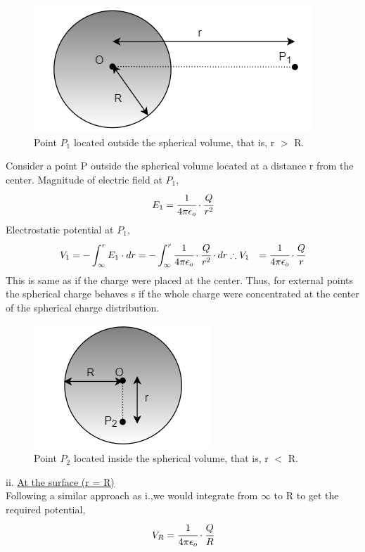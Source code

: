 \begin{figure}
     \centering 
     \includegraphics[scale = 0.6]{figures/elecmag/fig5.png}
     \caption{Point $P_1$ located outside the spherical volume, that is, r $>$ R. }
     \label{fig5}
 \end{figure}
Consider a point P outside the spherical volume located at a distance r from the center.
Magnitude of electric field at $P_1$,
\[E_1 = \cfrac{1}{4 \pi \epsilon_o}\cdot \cfrac{Q}{r^2}\]
Electrostatic potential at $P_1$,
\begin{align*}
V_1 = -\int_\infty^r E_1 \cdot dr &= - \int_\infty^r \cfrac{1}{4 \pi \epsilon_o}\cdot \cfrac{Q}{r^2} \cdot dr
 \therefore V_1 &= \cfrac{1}{4 \pi \epsilon_o}\cdot \cfrac{Q}{r} 
\end{align*}
This is same as if the charge were placed at the center. Thus, for external points the spherical charge behaves s if the whole charge were concentrated at the center of the spherical charge distribution.
\vspace{4pt}\\
\begin{figure}
     \centering 
     \includegraphics[scale = 0.7]{figures/elecmag/fig6.png}
     \caption{Point $P_2$ located inside the spherical volume, that is, r $<$ R. }
     \label{fig5}
 \end{figure}
ii. \underline{At the surface (r = R)}
\vspace{5pt}
\\ Following a similar approach as i.,we would integrate from $\infty$ to R to get the required potential, 
\[ V_R = \cfrac{1}{4 \pi \epsilon_o}\cdot \cfrac{Q}{R} \]

